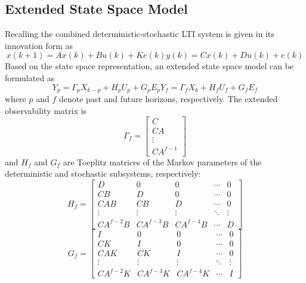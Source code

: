 \subsection{Extended State Space Model}\label{sec:extended_state_space_model}
Recalling the combined deterministic-stochastic LTI system is given in its innovation form as
\begin{subequations}
\begin{equation}x(k+1) = Ax(k) + Bu(k) + Ke(k)\end{equation}
\begin{equation}y(k) = Cx(k) + Du(k) + e(k)\end{equation}
\end{subequations}
Based on the state space representation, an extended state space model can be formulated as
\begin{subequations}
\begin{equation}Y_p = \Gamma_p X_{k-p} + H_p U_p + G_p E_p\end{equation}
\begin{equation}Y_f = \Gamma_f X_k + H_f U_f + G_f E_f\end{equation}
\end{subequations}
where $p$ and $f$ denote past and future horizons, respectively. The extended observability matrix is
\begin{equation*}
\Gamma_f = \begin{bmatrix}C\\ CA\\ \vdots\\ CA^{f-1}\end{bmatrix}
\end{equation*}
and $H_f$ and $G_f$ are Toeplitz matrices of the Markov parameters of the deterministic and stochastic subsystems, respectively:
\begin{equation*}
H_f = \begin{bmatrix}
D & 0 & 0 & \cdots & 0\\
CB & D & 0 & \cdots & 0\\
CAB & CB & D & \cdots & 0\\
\vdots & \vdots  & \vdots & \ddots & \vdots\\
CA^{f-2}B & CA^{f-3}B & CA^{f-4}B & \cdots & D
\end{bmatrix}
\end{equation*}
\begin{equation*}
G_f = \begin{bmatrix}
I & 0 & 0 & \cdots & 0\\
CK & I & 0 & \cdots & 0\\
CAK & CK & I & \cdots & 0\\
\vdots & \vdots  & \vdots & \ddots & \vdots\\
CA^{f-2}K & CA^{f-3}K & CA^{f-4}K & \cdots & I
\end{bmatrix}
\end{equation*}

